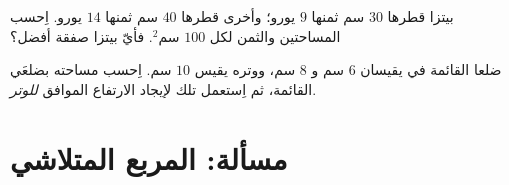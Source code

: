 \begin{exercise}[$\star\star$]\label{exo:g7:areas:11}
بيتزا قطرها $30$ سم ثمنها $9$ يورو؛ وأخرى قطرها $40$ سم
ثمنها $14$ يورو. اِحسب المساحتين والثمن لكل $100$
سم$^2$. فأيّ بيتزا صفقة أفضل؟
\end{exercise}

\begin{exercise}[$\star\star\star$]\label{exo:g7:areas:12}
ضلعا القائمة في  يقيسان $6$ سم و $8$ سم، ووتره
يقيس $10$ سم. اِحسب مساحته بضلعَي القائمة، ثم اِستعمل
تلك  لإيجاد الارتفاع الموافق \emph{للوتر}.
\end{exercise}

\section{مسألة: المربع المتلاشي}

